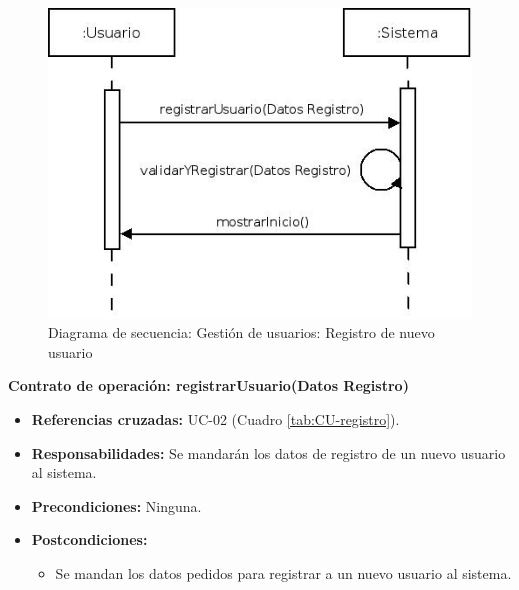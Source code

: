 \vspace{10mm}

\begin{figure}[H]
\centering
  \includegraphics[scale=.55]{img/secuencias/gestion-usuarios-registro.jpeg}
  \caption{Diagrama de secuencia: Gestión de usuarios: Registro de nuevo usuario}
  \label{fig:secuencia-gestion-usuarios-registro}
\end{figure}


\textbf{Contrato de operación: registrarUsuario(Datos Registro)}
\begin{itemize}
\item \textbf{Referencias cruzadas:} UC-02 (Cuadro \ref{tab:CU-registro}).
\item \textbf{Responsabilidades:} Se mandarán los datos de registro de un nuevo usuario al sistema.
\item \textbf{Precondiciones:} Ninguna.
\item \textbf{Postcondiciones:} 
 \begin{itemize}
\item Se mandan los datos pedidos para registrar a un nuevo usuario al sistema.
\end {itemize}
\end {itemize}



